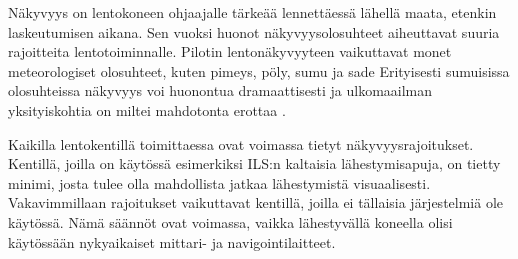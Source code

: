 \documentclass[utf8,bachelor,manualbib]{gradu3}
\begin{document}
Näkyvyys on lentokoneen ohjaajalle tärkeää lennettäessä lähellä maata, etenkin laskeutumisen aikana. Sen vuoksi huonot näkyvyysolosuhteet aiheuttavat suuria rajoitteita lentotoiminnalle. Pilotin lentonäkyvyyteen vaikuttavat monet meteorologiset olosuhteet, kuten pimeys, pöly, sumu ja sade \citep{wickens2009} Erityisesti sumuisissa olosuhteissa näkyvyys voi huonontua dramaattisesti ja ulkomaailman yksityiskohtia on miltei mahdotonta erottaa \citep{beiergemperlein2004}.

Kaikilla lentokentillä toimittaessa ovat voimassa tietyt näkyvyysrajoitukset. Kentillä, joilla on käytössä esimerkiksi ILS:n kaltaisia lähestymisapuja, on tietty minimi, josta tulee olla mahdollista jatkaa lähestymistä visuaalisesti. Vakavimmillaan rajoitukset vaikuttavat kentillä, joilla ei tällaisia järjestelmiä ole käytössä. Nämä säännöt ovat voimassa, vaikka lähestyvällä koneella olisi käytössään nykyaikaiset mittari- ja navigointilaitteet.~\cite{mollersachs1994}
\end{document}
